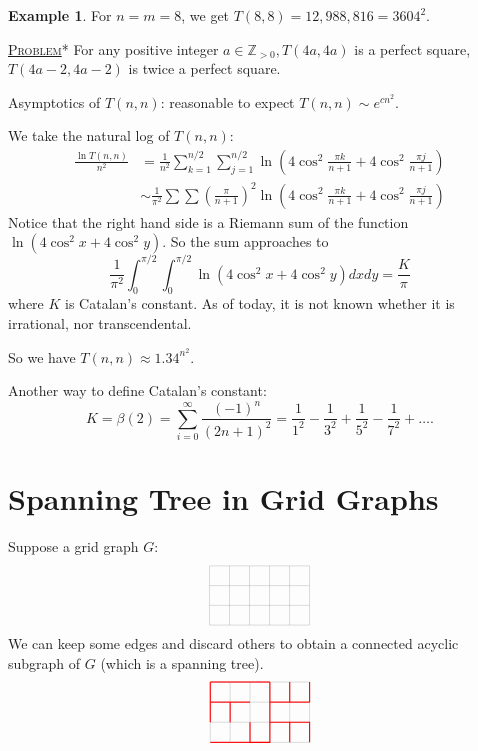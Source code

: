 \documentclass{report}
\newcommand{\Z}{\mathbb{Z}}
\newcommand{\fancyem}[1]{\underline{\textsc{#1}}}
\theoremstyle{definition}
\newtheorem{example}{Example}[section]
\theoremstyle{remark}
\numberwithin{equation}{section}
\begin{document}
\begin{example}
For $n = m = 8$, we get $T(8, 8) = 12,988,816 = 3604^2.$
\end{example}

\fancyem{Problem}* For any positive integer $a \in \Z_{>0}, T(4a, 4a)$ is a perfect square, $T(4a - 2, 4a - 2)$ is twice a perfect square.

Asymptotics of $T(n, n)$: reasonable to expect $T(n, n) \sim e^{cn^2}$.

We take the natural log of $T(n, n)$:
\begin{align*}
\frac{\ln T(n, n)}{n^2} & = \frac{1}{n^2}\sum_{k=1}^{n/2}\sum_{j=1}^{n/2} \ln\left(4\cos^2\frac{\pi k}{n+1} + 4\cos^2\frac{\pi j}{n+1}\right) \\
& \sim \frac{1}{\pi^2}\sum\sum \left(\frac{\pi}{n+1}\right)^2 \ln\left(4\cos^2\frac{\pi k}{n+1} + 4\cos^2\frac{\pi j}{n+1}\right)
\end{align*}
Notice that the right hand side is a Riemann sum of the function $\ln(4\cos^2x+4\cos^2y)$. So the sum approaches to 
\[
\frac{1}{\pi^2} \int_0^{\pi/2}\int_0^{\pi/2} \ln(4\cos^2x+4\cos^2y)dxdy = \frac{K}{\pi}
\]
where $K$ is Catalan's constant. As of today, it is not known whether it is irrational, nor transcendental.

So we have $T(n, n) \approx 1.34^{n^2}.$

Another way to define Catalan's constant:
\[
K = \beta(2) = \sum_{i=0}^\infty \frac{(-1)^n}{(2n+1)^2} = \frac{1}{1^2} - \frac{1}{3^2} + \frac{1}{5^2} - \frac{1}{7^2} + \ldots.
\]

\section{Spanning Tree in Grid Graphs}
Suppose a grid graph $G$:
\[\begin{tikzpicture}
\draw[step=0.5cm,gray,very thin] (-1.5, 1) grid (1, -0.5);
\end{tikzpicture}\]
We can keep some edges and discard others to obtain a connected acyclic subgraph of $G$ (which is a spanning tree).
\[\begin{tikzpicture}
\draw[step=0.5cm,gray,very thin] (-1.5, 1) grid (1, -0.5);
\draw[red, thick] (-1.5, 1) -- (-1, 1);
\draw[red, thick] (-1.5, 1) -- (-1.5, 0.5);
\draw[red, thick] (-1, 1) -- (-0.5, 1);
\draw[red, thick] (-1.5, 0.5) -- (-1, 0.5);
\draw[red, thick] (-1.5, 0.5) -- (-1.5, 0);
\draw[red, thick] (-1, 0.5) -- (-1, 0);
\draw[red, thick] (-1, 0.5) -- (-0.5, 0.5);
\draw[red, thick] (-1.5, -0.5) -- (-1, -0.5);
\draw[red, thick] (-0.5, 1) -- (0, 1);
\draw[red, thick] (-1, -0.5) -- (-0.5, -0.5);
\draw[red, thick] (-0.5, -0.5) -- (-0.5, 0);
\draw[red, thick] (0, 1) -- (0, 0.5);
\draw[red, thick] (0, 0.5) -- (0.5, 0.5);
\draw[red, thick] (0, 0.5) -- (0, 0) -- (0, -0.5) -- (-0.5, -0.5);
\draw[red, thick] (0.5, 0.5) -- (0.5, 1);
\draw[red, thick] (0.5, 0.5) -- (1, 0.5);
\draw[red, thick] (1, 0.5) -- (1, 1);
\draw[red, thick] (0, 0) -- (0.5, 0) -- (0.5, -0.5);
\draw[red, thick] (0.5, 0) -- (1, 0) -- (1, -0.5);
\end{tikzpicture}\]
\end{document}
